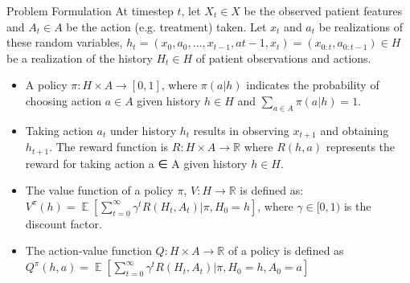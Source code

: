 \documentclass{beamer}
\DeclareMathOperator{\EX}{\mathbb{E}}%
\begin{document}
\begin{frame}{Problem Formulation}
    At timestep $t$, let $X_t \in X$ be the observed patient features and 
    $A_t \in A$ be the action (e.g. treatment) taken.
    Let $x_t$ and $a_t$ be realizations of these random variables, $h_t = (x_0, a_0, . . . , x_{t−1}, a{t−1}, x_t) = (x_{0:t}, a_{0:t−1}) \in H$ be a realization of the history $H_t \in H$ of patient observations and actions.\\
    \begin{itemize}
        \item A policy $\pi : H\times A \xrightarrow{} [0, 1]$, where $\pi(a | h)$ indicates the probability of choosing action $a \in A$ given history $h \in H$ and $\sum_{a \in A}{\pi(a |h)} = 1$.
        \item Taking action $a_t$ under history $h_t$ results in observing $x_{t+1}$ and obtaining $h_{t+1}$. The reward function is $R : H \times A \xrightarrow{} \mathbb{R}$ where $R(h, a)$ represents the reward for taking action a ∈ A given history $h \in H$.
        \item The value function of a policy $\pi$, $V : H \xrightarrow{} \mathbb{R}$ is defined as: $V^{\pi}(h) = \EX[\sum_{t=0}^{\infty} \gamma^tR(H_t, A_t) | \pi, H_0=h]$, where $\gamma \in [0,1)$ is the discount factor.
        \item The action-value function $Q: H \times A \xrightarrow{} \mathbb{R}$ of a policy is defined as $Q^\pi(h,a) = \EX[\sum_{t=0}^{\infty} \gamma^tR(H_t, A_t) | \pi, H_0=h, A_0 = a]$

        
    \end{itemize}
\end{frame}
\end{document}
